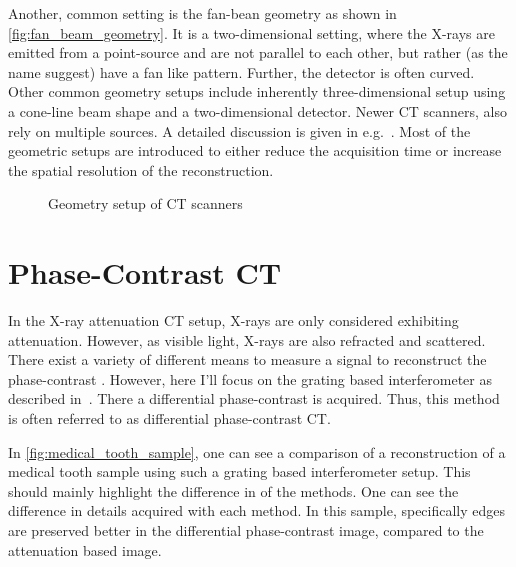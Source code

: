 Another, common setting is the fan-bean geometry as shown in \autoref{fig:fan_beam_geometry}. It is
a two-dimensional setting, where the X-rays are emitted from a point-source and are not parallel to
each other, but rather (as the name suggest) have a fan like pattern. Further, the detector is often
curved. Other common geometry setups include inherently three-dimensional setup using a cone-line
beam shape and a two-dimensional detector. Newer CT scanners, also rely on multiple sources. A
detailed discussion is given in e.g.\ \cite{buzug_computed_2008}. Most of the geometric setups are
introduced to either reduce the acquisition time or increase the spatial resolution of the
reconstruction.

\begin{figure}
	\centering
	\caption{Geometry setup of CT scanners}\label{fig:ct_geometry_setup}
\end{figure}

\section{Phase-Contrast CT}\label{sec:phasecontrast_ct}

In the X-ray attenuation CT setup, X-rays are only considered exhibiting attenuation. However, as
visible light, X-rays are also refracted and scattered. There exist a variety of different means to
measure a signal to reconstruct the phase-contrast . However, here I'll focus on the grating based interferometer as described
in~\cite{pfeiffer_hard-x-ray_2008}. There a differential phase-contrast is acquired. Thus, this
method is often referred to as differential phase-contrast CT\@.

In \autoref{fig:medical_tooth_sample}, one can see a comparison of a reconstruction of a medical
tooth sample using such a grating based interferometer setup. This should mainly highlight the
difference in of the methods. One can see the difference in details acquired with each method. In
this sample, specifically edges are preserved better in the differential phase-contrast image,
compared to the attenuation based image.


